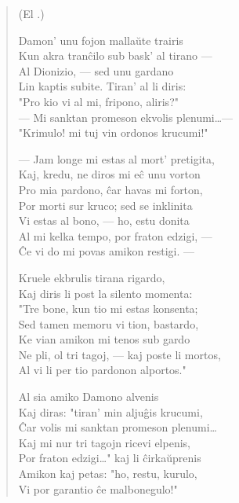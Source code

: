 \begin{verse}
\begin{center}
\footnotesize (El .)
\end{center}
                  Damon' unu fojon malla\u ute trairis\\
                  Kun akra tran\^cilo sub bask' al tirano ---\\
                  Al Dionizio, --- sed unu gardano\\
                  Lin kaptis subite. Tiran' al li diris:\\
                  "Pro kio vi al mi, fripono, aliris?"\\
                  --- Mi sanktan promeson ekvolis plenumi\dots ---\\
                  "Krimulo! mi tuj vin ordonos krucumi!"

                  --- Jam longe mi estas al mort' pretigita,\\
                  Kaj, kredu, ne diros mi e\^c unu vorton\\
                  Pro mia pardono, \^car havas mi forton,\\
                  Por morti sur kruco; sed se inklinita\\
                  Vi estas al bono, --- ho, estu donita\\
                  Al mi kelka tempo, por fraton edzigi, ---\\
                  \^Ce vi do mi povas amikon restigi. ---

                  Kruele ekbrulis tirana rigardo,\\
                  Kaj diris li post la silento momenta:\\
                  "Tre bone, kun tio mi estas konsenta;\\
                  Sed tamen memoru vi tion, bastardo,\\
                  Ke vian amikon mi tenos sub gardo\\
                  Ne pli, ol tri tagoj, --- kaj poste li mortos,\\
                  Al vi li per tio pardonon alportos."

                  Al sia amiko Damono alvenis\\
                  Kaj diras: "tiran' min alju\^gis krucumi,\\
                  \^Car volis mi sanktan promeson plenumi\dots\\
                  Kaj mi nur tri tagojn ricevi elpenis,\\
                  Por fraton edzigi\dots" kaj li \^cirka\u uprenis\\
                  Amikon kaj petas: "ho, restu, kurulo,\\
                  Vi por garantio \^ce malbonegulo!"


\end{verse}
